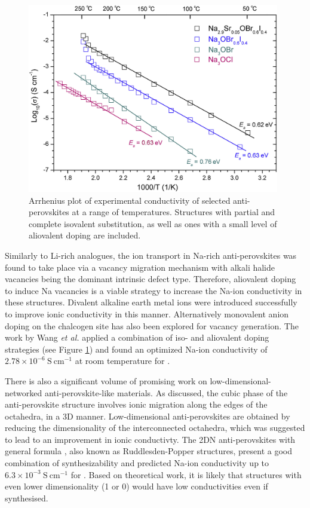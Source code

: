 \documentclass[12pt]{report}
\begin{document}
\begin{figure}[!ht]
\centering
\includegraphics[width=11cm]{./figures/cond_plot.jpg}
\caption{Arrhenius plot of experimental conductivity of selected anti-perovskites at a range of temperatures. Structures with partial and complete isovalent substitution, as well as ones with a small level of aliovalent doping are included.\cite{wang2015a}}
\label{plot}
\end{figure}

Similarly to Li-rich analogues, the ion transport in Na-rich anti-perovskites was found to take place via a vacancy migration mechanism\cite{zhu2016} with alkali halide vacancies being the dominant intrinsic defect type.\cite{dawson2018c, wan2018}
Therefore, aliovalent doping to induce Na vacancies is a viable strategy to increase the Na-ion conductivity in these structures.
Divalent alkaline earth metal ions were introduced successfully to improve ionic conductivity in this manner.\cite{wang2015a, fan2020, wan2018} 
Alternatively monovalent anion doping on the chalcogen site has also been explored for vacancy generation.\cite{gao2021}
The work by Wang \textit{et al.} applied a combination of iso- and aliovalent doping strategies (see Figure \ref{plot}) and found an optimized Na-ion conductivity of $2.78 \times 10^{-6} \ \mathrm{S \ cm^{-1}}$ at room temperature for .\cite{wang2015a}

There is also a significant volume of promising work on low-dimensional-networked anti-perovskite-like materials.\cite{lu2020, zhu2016, yu2019}
As discussed, the cubic phase of the anti-perovskite structure involves ionic migration along the edges of the  octahedra, in a 3D manner.
Low-dimensional anti-perovskites are obtained by reducing the dimensionality of the interconnected octahedra, which was suggested to lead to an improvement in ionic conductivty.
The 2DN anti-perovskites with general formula , also known as Ruddlesden-Popper structures, present a good combination of synthesizability and predicted Na-ion conductivity up to $6.3 \times 10^{-3} \ \mathrm{S \ cm^{-1}} $ for .
Based on theoretical work, it is likely that structures with even lower dimensionality (1 or 0) would have low conductivities even if synthesised.\cite{lu2020}
  
\end{document}
